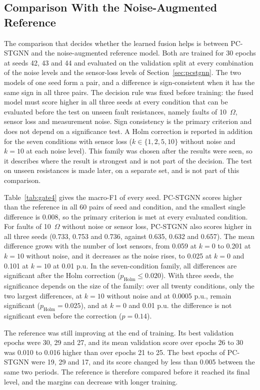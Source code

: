 \documentclass[MTech]{ugthesis}
\begin{document}
\subsection{Comparison With the Noise-Augmented Reference}

The comparison that decides whether the learned fusion helps is between \ac{PC-STGNN} and the noise-augmented reference model. Both are trained for 30 epochs at seeds 42, 43 and 44 and evaluated on the validation split at every combination of the noise levels and the sensor-loss levels of Section~\ref{sec:pcstgnn}. The two models of one seed form a pair, and a difference is sign-consistent when it has the same sign in all three pairs. The decision rule was fixed before training: the fused model must score higher in all three seeds at every condition that can be evaluated before the test on unseen fault resistances, namely faults of 10~$\Omega$, sensor loss and measurement noise. Sign consistency is the primary criterion and does not depend on a significance test. A Holm correction is reported in addition for the seven conditions with sensor loss ($k\in\{1,2,5,10\}$ without noise and $k=10$ at each noise level). This family was chosen after the results were seen, so it describes where the result is strongest and is not part of the decision. The test on unseen resistances is made later, on a separate set, and is not part of this comparison.

Table~\ref{tab:gate4} gives the macro-F1 of every seed. \ac{PC-STGNN} scores higher than the reference in all 60 pairs of seed and condition, and the smallest single difference is 0.008, so the primary criterion is met at every evaluated condition. For faults of 10~$\Omega$ without noise or sensor loss, \ac{PC-STGNN} also scores higher in all three seeds (0.733, 0.753 and 0.736, against 0.635, 0.632 and 0.657). The mean difference grows with the number of lost sensors, from 0.059 at $k=0$ to 0.201 at $k=10$ without noise, and it decreases as the noise rises, to 0.025 at $k=0$ and 0.101 at $k=10$ at 0.01 p.u. In the seven-condition family, all differences are significant after the Holm correction ($p_{\mathrm{Holm}}\le0.020$). With three seeds, the significance depends on the size of the family: over all twenty conditions, only the two largest differences, at $k=10$ without noise and at 0.0005 p.u., remain significant ($p_{\mathrm{Holm}}=0.025$), and at $k=0$ and 0.01 p.u. the difference is not significant even before the correction ($p=0.14$).

The reference was still improving at the end of training. Its best validation epochs were 30, 29 and 27, and its mean validation score over epochs 26 to 30 was 0.010 to 0.016 higher than over epochs 21 to 25. The best epochs of \ac{PC-STGNN} were 19, 29 and 17, and its score changed by less than 0.005 between the same two periods. The reference is therefore compared before it reached its final level, and the margins can decrease with longer training.
\end{document}
